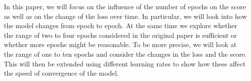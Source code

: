 In this paper, we will focus on the influence of the number of epochs on the score as well as on the change of the loss over time. In particular, we will look into how the model changes from epoch to epoch. At the same time we explore whether the range of two to four epochs considered in the original paper is sufficient or whether more epochs might be reasonable. To be more precise, we will look at the range of one to ten epochs and consider the changes in the loss and the score. This will then be extended using different learning rates to show how these affect the speed of convergence of the model.  

